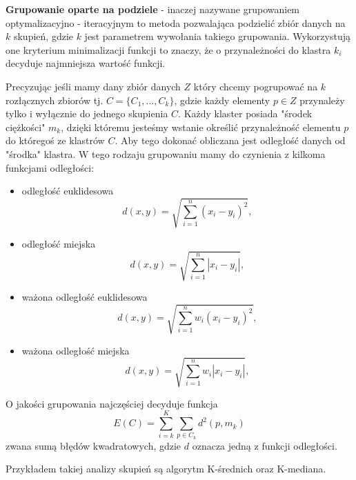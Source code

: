 \documentclass[twoside]{pracaMagisterskaMS}
\begin{document}
\textbf{Grupowanie oparte na podziele} - inaczej nazywane grupowaniem optymalizacyjno - iteracyjnym to metoda pozwalająca podzielić zbiór danych na $k$ skupień, gdzie $k$ jest parametrem wywołania takiego grupowania. Wykorzystują one kryterium minimalizacji funkcji to znaczy, że o przynależności do klastra $k_i$ decyduje najmniejsza wartość funkcji.

Precyzując jeśli mamy dany zbiór danych $Z$ który chcemy pogrupować na $k$ rozłącznych zbiorów tj. $C = \{C_1,...,C_k\}$, gdzie każdy elementy $p \in Z $ przynależy tylko i wyłącznie do jednego skupienia $C$. Każdy klaster posiada "środek ciężkości" $m_k$, dzięki któremu jesteśmy wstanie określić przynależność elementu $p$ do któregoś ze klastrów $C$. Aby tego dokonać obliczana jest odległość danych od "środka" klastra. W tego rodzaju grupowaniu mamy do czynienia z kilkoma funkcjami odległości:
\begin{itemize}
\item odległość euklidesowa
	\begin{equation}
		d(x,y) = \sqrt{ \sum_{i=1}^{n}(x_{i} - y_{i})^2},
	\end{equation}
\item odległość miejska
	\begin{equation}
		d(x,y) = \sqrt{ \sum_{i=1}^{n}|x_{i} - y_{i}|},
	\end{equation}
\item ważona odległość euklidesowa
	\begin{equation}
		d(x,y) = \sqrt{ \sum_{i=1}^{n}w_{i}(x_{i} - y_{i})^2},
	\end{equation}
\item ważona odległość miejska
	\begin{equation}
		d(x,y) = \sqrt{ \sum_{i=1}^{n}w_{i}|x_{i} - y_{i}|},
	\end{equation}
\end{itemize}

\noindent O jakości grupowania najczęściej decyduje funkcja 
\begin{equation}
E(C) = \sum_{i=k}^{K} \sum_{p \in C_k} d^2(p, m_{k})
\end{equation}
zwana sumą błędów kwadratowych, gdzie $d$ oznacza jedną z funkcji odległości.

Przykładem takiej analizy skupień są algorytm K-średnich oraz K-mediana.\\
\end{document}
